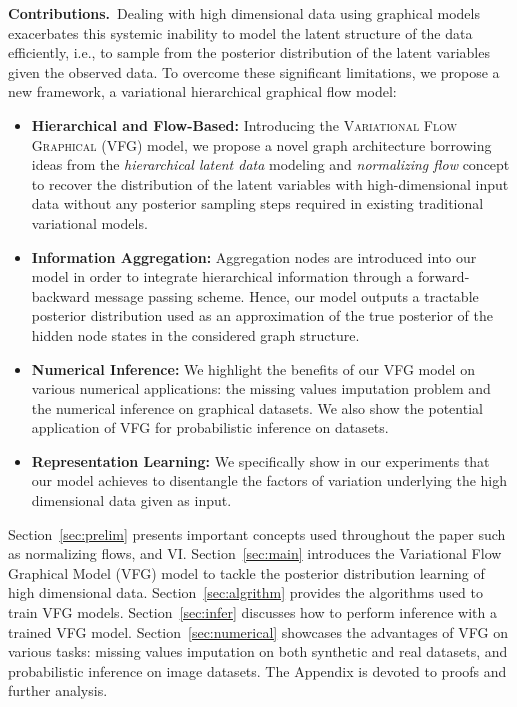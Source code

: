 \documentclass[twoside]{article}
\begin{document}
\textbf{Contributions.}\ Dealing with high dimensional data using graphical models exacerbates this systemic inability to model the latent structure of the data efficiently, i.e., to sample from the posterior distribution of the latent variables given the observed data.
To overcome these significant limitations, we propose a new framework, a variational hierarchical graphical flow model:
\begin{itemize}
    \item \textbf{Hierarchical and Flow-Based:} Introducing the \textsc{Variational Flow Graphical (VFG)} model, we propose a novel graph architecture borrowing ideas from the \emph{hierarchical latent data} modeling and \emph{normalizing flow} concept to recover the distribution of the latent variables with high-dimensional input data without any posterior sampling steps required in existing traditional variational models. 
    
    \item \textbf{Information Aggregation:} Aggregation nodes are introduced into our model in order to integrate hierarchical information through a forward-backward message passing scheme.  
Hence, our model outputs a tractable posterior distribution used as an approximation of the true posterior of the hidden node states in the considered graph structure. 

    \item \textbf{Numerical Inference:} We highlight the benefits of our VFG model on various numerical applications: the missing values imputation problem and the numerical inference on graphical datasets. 
    We also show the potential application of VFG for probabilistic inference on datasets. 
    
    \item \textbf{Representation Learning:} We specifically show in our experiments that our model achieves to disentangle the factors of variation underlying the high dimensional data given as input.
\end{itemize}

Section~\ref{sec:prelim} presents important concepts used throughout the paper such as normalizing flows, and VI.
Section~\ref{sec:main} introduces the Variational Flow Graphical Model (VFG) model to tackle the posterior distribution learning of high dimensional data.
Section~\ref{sec:algrithm} provides the algorithms used to train VFG models. 
Section~\ref{sec:infer} discusses how to perform inference with a trained VFG model. 
Section~\ref{sec:numerical} showcases the advantages of VFG on various tasks: missing values imputation on both synthetic and real datasets, and probabilistic inference on image datasets.
The Appendix is devoted to proofs and further analysis. 
\end{document}
